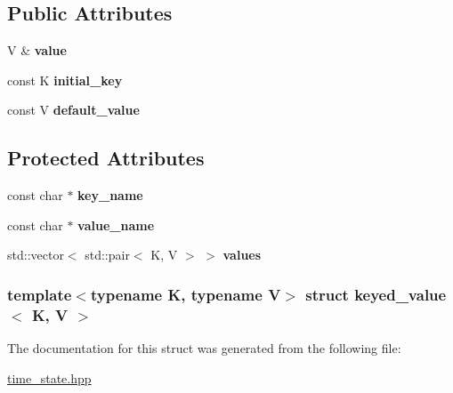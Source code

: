 \subsection*{Public Attributes}
\begin{DoxyCompactItemize}
\item 
\hypertarget{structkeyed__value_ad9a8b0061bc126c239d11e72db9ef8ea}{
V \& {\bfseries value}}
\label{structkeyed__value_ad9a8b0061bc126c239d11e72db9ef8ea}

\item 
\hypertarget{structkeyed__value_aa2e1231c1f0adda11931eaf290d58cdf}{
const K {\bfseries initial\_\-key}}
\label{structkeyed__value_aa2e1231c1f0adda11931eaf290d58cdf}

\item 
\hypertarget{structkeyed__value_ace3c1d7bd10a09884c33ff94d3b54dee}{
const V {\bfseries default\_\-value}}
\label{structkeyed__value_ace3c1d7bd10a09884c33ff94d3b54dee}

\end{DoxyCompactItemize}
\subsection*{Protected Attributes}
\begin{DoxyCompactItemize}
\item 
\hypertarget{structkeyed__value_ad4fb83376afa71ff30330019f9c392db}{
const char $\ast$ {\bfseries key\_\-name}}
\label{structkeyed__value_ad4fb83376afa71ff30330019f9c392db}

\item 
\hypertarget{structkeyed__value_aa9010fbc96f2747c43b1778c09582ccd}{
const char $\ast$ {\bfseries value\_\-name}}
\label{structkeyed__value_aa9010fbc96f2747c43b1778c09582ccd}

\item 
\hypertarget{structkeyed__value_ad5b0261c6ecd3083c536968e66cc7221}{
std::vector$<$ std::pair$<$ K, V $>$ $>$ {\bfseries values}}
\label{structkeyed__value_ad5b0261c6ecd3083c536968e66cc7221}

\end{DoxyCompactItemize}
\subsubsection*{template$<$typename K, typename V$>$ struct keyed\_\-value$<$ K, V $>$}



The documentation for this struct was generated from the following file:\begin{DoxyCompactItemize}
\item 
\hyperlink{time__state_8hpp}{time\_\-state.hpp}\end{DoxyCompactItemize}
